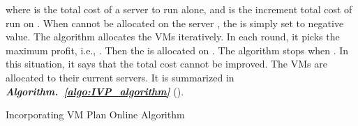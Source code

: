 \documentclass[10pt,journal]{IEEEtran}
\begin{document}
where  is the total cost of a server to run  alone, and  is the increment total cost of run  on . When  cannot be allocated on the server , the  is simply set to negative value. The algorithm allocates the VMs iteratively. In each round, it picks the maximum profit, i.e., . Then the  is allocated on . The algorithm stops when . In this situation, it says that the total cost cannot be improved. The VMs are allocated to their current servers. It is summarized in \textbf{\textit{Algorithm.~\ref{algo:IVP_algorithm}}} (). 
\begin{algorithm}
\caption{\label{algo:IVP_algorithm}Incorporating VM Plan Online Algorithm}
\end{algorithm}
\end{document}

